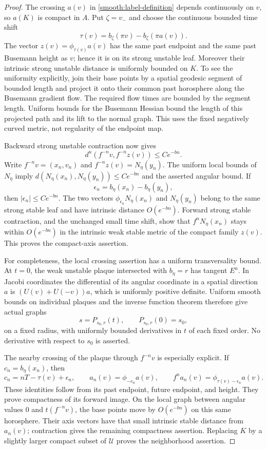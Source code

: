 \begin{proof}
The crossing $a(v)$ in \eqref{smooth:label-definition} depends
continuously on $v$, so $a(K)$ is compact in $A$.  Put $\zeta=v_-$ and
choose the continuous bounded time shift
\[
 \tau(v)=b_\zeta(\pi v)-b_\zeta(\pi a(v)).
\]
The vector $z(v)=\phi_{\tau(v)}a(v)$ has the same past endpoint and the
same past Busemann height as $v$; hence it is on its strong unstable
leaf.  Moreover their intrinsic strong unstable distance is uniformly
bounded on $K$.  To see the uniformity explicitly, join their base
points by a spatial geodesic segment of bounded length and project it
onto their common past horosphere along the Busemann gradient flow.
The required flow times are bounded by the segment length.  Uniform
bounds for the Busemann Hessian bound the length of this projected path
and its lift to the normal graph.  This uses the fixed negatively
curved metric, not regularity of the endpoint map.

Backward strong unstable contraction now gives
\[
 d^u(f^{-n}v,f^{-n}z(v))\leq Ce^{-bn}.
\]
Write $f^{-n}v=(x_n,v_n)$ and $f^{-n}z(v)=N_\eta(y_n)$.
The uniform local bounds of $N_\eta$ imply
$d(N_\eta(x_n),N_\eta(y_n))\leq Ce^{-bn}$ and the asserted angular
bound.  If
\[
 \epsilon_n=b_\eta(x_n)-b_\eta(y_n),
\]
then $|\epsilon_n|\leq Ce^{-bn}$.  The two vectors
$\phi_{\epsilon_n}N_\eta(x_n)$ and $N_\eta(y_n)$ belong to the same
strong stable leaf and have intrinsic distance $O(e^{-bn})$.
Forward strong stable contraction, and the unchanged small time shift,
show that $f^nN_\eta(x_n)$ stays within $O(e^{-bn})$ in the intrinsic
weak stable metric of the compact family $z(v)$.  This proves the
compact-axis assertion.

For completeness, the local crossing assertion has a uniform
transversality bound.  At $t=0$, the weak unstable plaque intersected with
$b_\eta=r$ has tangent $E^u$.  In Jacobi coordinates the differential of
its angular coordinate in a spatial direction $a$ is
$(U(v)+U(-v))a$, which is uniformly positive definite.  Uniform smooth
bounds on individual plaques and the inverse function theorem therefore
give actual graphs
\begin{equation}
 \label{smooth:actual-graphs}
 s=P_{s_0,r}(t),\qquad P_{s_0,r}(0)=s_0,
\end{equation}
on a fixed radius, with uniformly bounded derivatives in $t$ of each
fixed order.  No derivative with respect to $s_0$ is asserted.

The nearby crossing of the plaque through $f^{-n}v$ is especially
explicit.  If $c_n=b_\eta(x_n)$, then
\[
 c_n=nT-\tau(v)+\epsilon_n,
 \qquad a_n(v)=\phi_{-c_n}a(v),
 \qquad f^na_n(v)=\phi_{\tau(v)-\epsilon_n}a(v).
\]
These identities follow from its past endpoint, future endpoint, and
height.  They prove compactness of its forward image.  On the local
graph between angular values $0$ and $t(f^{-n}v)$, the base points move
by $O(e^{-bn})$ on this same horosphere.  Their axis vectors have that
small intrinsic stable distance from $a_n(v)$; contraction gives the
remaining compactness assertion.  Replacing $K$ by a slightly larger
compact subset of $\mathcal U$ proves the neighborhood assertion.
\end{proof}

